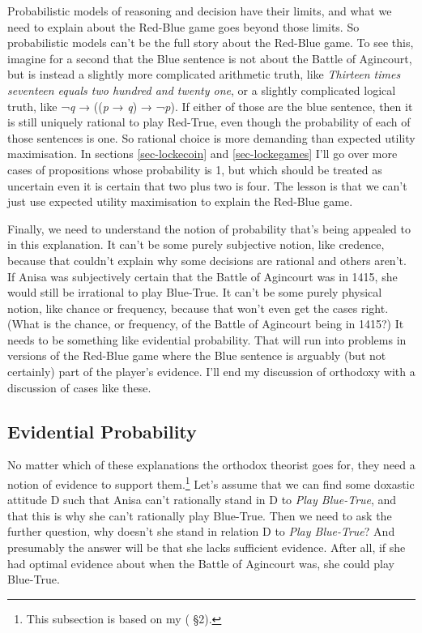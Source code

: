 \documentclass[
  10pt,
  letterpaper,
  twoside]{scrbook}
\begin{document}
Probabilistic models of reasoning and decision have their limits, and
what we need to explain about the Red-Blue game goes beyond those
limits. So probabilistic models can't be the full story about the
Red-Blue game. To see this, imagine for a second that the Blue sentence
is not about the Battle of Agincourt, but is instead a slightly more
complicated arithmetic truth, like \emph{Thirteen times seventeen equals
two hundred and twenty one}, or a slightly complicated logical truth,
like ¬\emph{q} → ((\emph{p} → \emph{q}) → ¬\emph{p}). If either of those
are the blue sentence, then it is still uniquely rational to play
Red-True, even though the probability of each of those sentences is one.
So rational choice is more demanding than expected utility maximisation.
In sections \ref{sec-lockecoin} and \ref{sec-lockegames} I'll go over
more cases of propositions whose probability is 1, but which should be
treated as uncertain even it is certain that two plus two is four. The
lesson is that we can't just use expected utility maximisation to
explain the Red-Blue game.

Finally, we need to understand the notion of probability that's being
appealed to in this explanation. It can't be some purely subjective
notion, like credence, because that couldn't explain why some decisions
are rational and others aren't. If Anisa was subjectively certain that
the Battle of Agincourt was in 1415, she would still be irrational to
play Blue-True. It can't be some purely physical notion, like chance or
frequency, because that won't even get the cases right. (What is the
chance, or frequency, of the Battle of Agincourt being in 1415?) It
needs to be something like evidential probability. That will run into
problems in versions of the Red-Blue game where the Blue sentence is
arguably (but not certainly) part of the player's evidence. I'll end my
discussion of orthodoxy with a discussion of cases like these.

\subsection{Evidential Probability}\label{sec-orthodoxevidence}

No matter which of these explanations the orthodox theorist goes for,
they need a notion of evidence to support them.\footnote{This subsection
  is based on my ( §2).}
Let's assume that we can find some doxastic attitude D such that Anisa
can't rationally stand in D to \emph{Play Blue-True}, and that this is
why she can't rationally play Blue-True. Then we need to ask the further
question, why doesn't she stand in relation D to \emph{Play Blue-True}?
And presumably the answer will be that she lacks sufficient evidence.
After all, if she had optimal evidence about when the Battle of
Agincourt was, she could play Blue-True.
\end{document}
